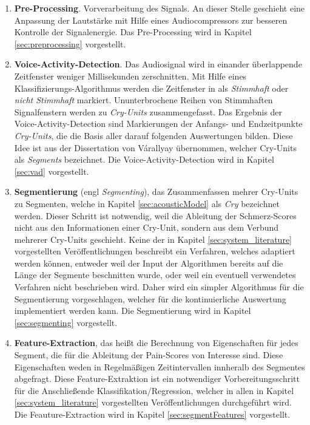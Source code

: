 \begin{enumerate}[leftmargin=*]
	\item \textbf{Pre-Processing}. Vorverarbeitung des Signals. An dieser Stelle geschieht eine Anpassung der Lautstärke mit Hilfe eines Audiocompressors zur besseren Kontrolle der Signalenergie. Das Pre-Processing wird in Kapitel \ref{sec:preprocessing} vorgestellt.
	
	\item \textbf{Voice-Activity-Detection}. Das Audiosignal wird in einander überlappende Zeitfenster weniger Millisekunden zerschnitten. Mit Hilfe eines Klassifizierungs-Algorithmus werden die Zeitfenster in als \emph{Stimmhaft} oder \emph{nicht Stimmhaft} markiert. Ununterbrochene Reihen von Stimmhaften Signalfenstern werden zu \emph{Cry-Units} zusammengefasst. Das Ergebnis der Voice-Activity-Detection sind Markierungen der Anfangs- und Endzeitpunkte \emph{Cry-Units}, die die Basis aller darauf folgenden Auswertungen bilden. Diese Idee ist aus der Dissertation von Várallyay \cite[S. 16 - 17]{cry_thesis} übernommen, welcher Cry-Units als \emph{Segments} bezeichnet. Die Voice-Activity-Detection wird in Kapitel \ref{sec:vad} vorgestellt.
	
	\item \textbf{Segmentierung} (engl \emph{Segmenting}), das Zusammenfassen mehrer Cry-Units zu Segmenten, welche in Kapitel \ref{sec:acousticModel} als \emph{Cry} bezeichnet werden. Dieser Schritt ist notwendig, weil die Ableitung der Schmerz-Scores nicht aus den Informationen einer Cry-Unit, sondern aus dem Verbund mehrerer Cry-Units geschieht. Keine der in Kapitel \ref{sec:system_literature} vorgestellten Veröffentlichungen beschreibt ein Verfahren, welches  adaptiert werden können, entweder weil der Input der Algorithmen bereits auf die Länge der Segmente beschnitten wurde, oder weil ein eventuell verwendetes Verfahren nicht beschrieben wird. Daher wird ein simpler Algorithmus für die Segmentierung vorgeschlagen, welcher für die kontinuierliche Auswertung implementiert werden kann. Die Segmentierung wird in Kapitel \ref{sec:segmenting} vorgestellt.		
	
	\item \textbf{Feature-Extraction}, das heißt die Berechnung von Eigenschaften für jedes Segment, die für die Ableitung der Pain-Scores von Interesse sind. Diese Eigenschaften weden in Regelmäßigen Zeitintervallen innheralb des Segmentes abgefragt. Diese Feature-Extraktion ist ein notwendiger Vorbereitungsschritt für die Anschließende Klassifikation/Regression, welcher in allen in Kapitel \ref{sec:system_literature} vorgestellten Veröffentlichungen durchgeführt wird.
	Die Feauture-Extraction wird in Kapitel \ref{sec:segmentFeatures} vorgestellt.	
	

\end{enumerate}
